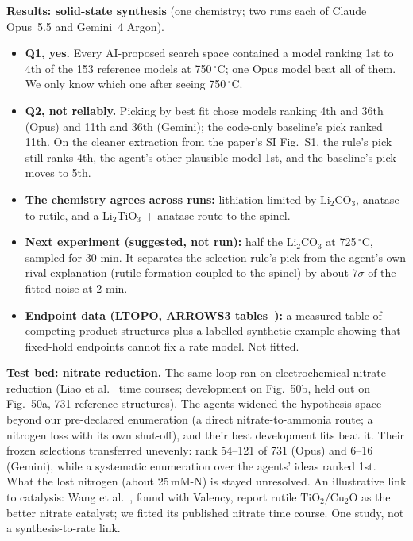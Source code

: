 \documentclass[10pt]{article}
\newcommand{\chem}[1]{\ensuremath{\mathrm{#1}}}
\newcommand{\degC}{\ensuremath{^{\circ}}C}
\begin{document}
\textbf{Results: solid-state synthesis} (one chemistry; two runs each of Claude Opus~5.5 and Gemini~4 Argon).
\begin{itemize}
\item \textbf{Q1, yes.} Every AI-proposed search space contained a model ranking 1st to 4th of the 153 reference models at 750\,\degC; one Opus model beat all of them. We only know which one after seeing 750\,\degC.
\item \textbf{Q2, not reliably.} Picking by best fit chose models ranking 4th and 36th (Opus) and 11th and 36th (Gemini); the code-only baseline's pick ranked 11th. On the cleaner extraction from the paper's SI Fig.~S1, the rule's pick still ranks 4th, the agent's other plausible model 1st, and the baseline's pick moves to 5th.
\item \textbf{The chemistry agrees across runs:} lithiation limited by $\chem{Li_2CO_3}$, anatase to rutile, and a $\chem{Li_2TiO_3}$ + anatase route to the spinel.
\item \textbf{Next experiment (suggested, not run):} half the $\chem{Li_2CO_3}$ at 725\,\degC, sampled for 30 min. It separates the selection rule's pick from the agent's own rival explanation (rutile formation coupled to the spinel) by about $7\sigma$ of the fitted noise at 2 min.
\item \textbf{Endpoint data (LTOPO, ARROWS3 tables~\cite{szymanski2023}):} a measured table of competing product structures plus a labelled synthetic example showing that fixed-hold endpoints cannot fix a rate model. Not fitted.
\end{itemize}

\textbf{Test bed: nitrate reduction.} The same loop ran on electrochemical nitrate reduction (Liao et al.~\cite{liao2025} time courses; development on Fig.~50b, held out on Fig.~50a, 731 reference structures). The agents widened the hypothesis space beyond our pre-declared enumeration (a direct nitrate-to-ammonia route; a nitrogen loss with its own shut-off), and their best development fits beat it. Their frozen selections transferred unevenly: rank 54--121 of 731 (Opus) and 6--16 (Gemini), while a systematic enumeration over the agents' ideas ranked 1st. What the lost nitrogen (about 25\,mM-N) is stayed unresolved. An illustrative link to catalysis: Wang et al.~\cite{wang2025}, found with Valency, report rutile $\chem{TiO_2/Cu_2O}$ as the better nitrate catalyst; we fitted its published nitrate time course. One study, not a synthesis-to-rate link.
\end{document}
